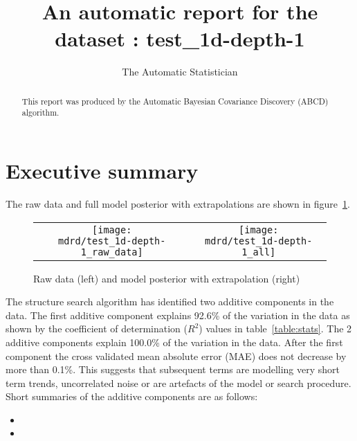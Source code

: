 \documentclass{article} %
\title{An automatic report for the dataset : test_1d-depth-1}
\author{
The Automatic Statistician
}
\begin{document}
\allowdisplaybreaks

\maketitle

\begin{abstract}
This report was produced by the Automatic Bayesian Covariance Discovery (ABCD) algorithm.
\end{abstract}

\section{Executive summary}

The raw data and full model posterior with extrapolations are shown in figure~\ref{fig:rawandfit}.

\begin{figure}[H]
\newcommand{\wmgd}{0.5\columnwidth}
\newcommand{\hmgd}{3.0cm}
\newcommand{\mdrd}{test_1d-depth-1}
\newcommand{\mbm}{\hspace{-0.3cm}}
\begin{tabular}{cc}
\mbm \texttt{[image: \\mdrd/test\_1d-depth-1\_raw\_data]} & \texttt{[image: \\mdrd/test\_1d-depth-1\_all]}
\end{tabular}
\caption{Raw data (left) and model posterior with extrapolation (right)}
\label{fig:rawandfit}
\end{figure}

The structure search algorithm has identified two additive components in the data.
The  first additive component explains 92.6\% of the variation in the data as shown by the coefficient of determination ($R^2$) values in table~\ref{table:stats}.
The 2 additive components explain 100.0\% of the variation in the data.
After the first component the cross validated mean absolute error (MAE) does not decrease by more than 0.1\%.
This suggests that subsequent terms are modelling very short term trends, uncorrelated noise or are artefacts of the model or search procedure.
Short summaries of the additive components are as follows:
\begin{itemize}

  \item  

  \item  

\end{itemize}
\end{document}
